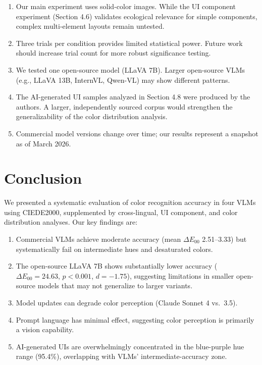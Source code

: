 \documentclass[11pt,a4paper]{article}
\begin{document}
\begin{enumerate}
    \item Our main experiment uses solid-color images. While the UI component experiment (Section 4.6) validates ecological relevance for simple components, complex multi-element layouts remain untested.
    \item Three trials per condition provides limited statistical power. Future work should increase trial count for more robust significance testing.
    \item We tested one open-source model (LLaVA 7B). Larger open-source VLMs (e.g., LLaVA 13B, InternVL, Qwen-VL) may show different patterns.
    \item The AI-generated UI samples analyzed in Section 4.8 were produced by the authors. A larger, independently sourced corpus would strengthen the generalizability of the color distribution analysis.
    \item Commercial model versions change over time; our results represent a snapshot as of March 2026.
\end{enumerate}

\section{Conclusion}

We presented a systematic evaluation of color recognition accuracy in four VLMs using CIEDE2000, supplemented by cross-lingual, UI component, and color distribution analyses. Our key findings are:

\begin{enumerate}
    \item Commercial VLMs achieve moderate accuracy (mean $\Delta E_{00}$ 2.51--3.33) but systematically fail on intermediate hues and desaturated colors.
    \item The open-source LLaVA 7B shows substantially lower accuracy ($\Delta E_{00} = 24.63$, $p < 0.001$, $d = -1.75$), suggesting limitations in smaller open-source models that may not generalize to larger variants.
    \item Model updates can degrade color perception (Claude Sonnet 4 vs.\ 3.5).
    \item Prompt language has minimal effect, suggesting color perception is primarily a vision capability.
    \item AI-generated UIs are overwhelmingly concentrated in the blue-purple hue range (95.4\%), overlapping with VLMs' intermediate-accuracy zone.
\end{enumerate}
\end{document}
